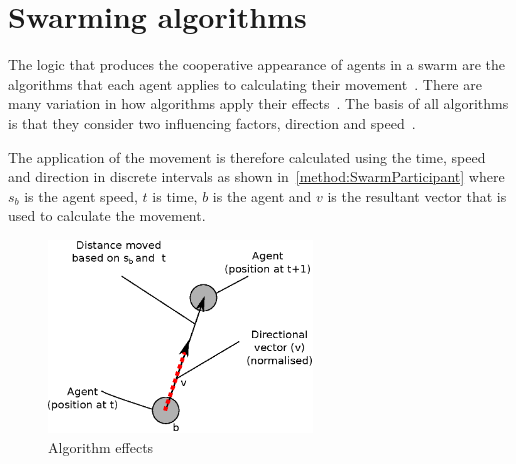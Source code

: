 \section{Swarming algorithms} 
The logic that produces the cooperative appearance of agents in a swarm are the algorithms that each agent applies to calculating their movement~\cite{BS:13, DLK:11, HAY:08}. There are many variation in how algorithms apply their effects~\cite{BBBV:04, DT:03}. The basis of all algorithms is that they consider two influencing factors, direction and speed~\cite{BAF:06, BAFVM:06, BVD:14, EP:10}. 

The application of the movement is therefore calculated using the time, speed and direction in discrete intervals as shown in~\autoref{method:SwarmParticipant} where $s_b$ is the agent speed, $t$ is time, $b$ is the agent and $v$ is the resultant vector that is used to calculate the movement.

\begin{figure}[H]
\begin{center}
\includegraphics[width=7cm]{CHAPTER-2/figures/SwarmParticipant}
\caption{Algorithm effects \label{method:SwarmParticipant}}
\end{center}
\end{figure}


